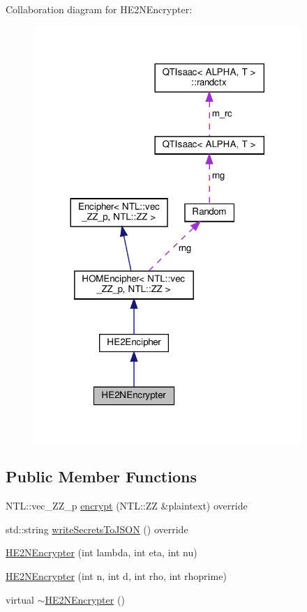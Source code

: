 Collaboration diagram for H\+E2\+N\+Encrypter\+:\nopagebreak
\begin{figure}[H]
\begin{center}
\leavevmode
\includegraphics[width=288pt]{classHE2NEncrypter__coll__graph}
\end{center}
\end{figure}
\subsection*{Public Member Functions}
\begin{DoxyCompactItemize}
\item 
N\+T\+L\+::vec\+\_\+\+Z\+Z\+\_\+p \hyperlink{classHE2NEncrypter_aa7ae559f2407b7a5527bd42470224e1b}{encrypt} (N\+T\+L\+::\+ZZ \&plaintext) override
\item 
std\+::string \hyperlink{classHE2NEncrypter_a720d4ee52dadd55f61631554d2942a6b}{write\+Secrets\+To\+J\+S\+ON} () override
\item 
\hyperlink{classHE2NEncrypter_aa71432cbbe9565717fc5af638649d8d8}{H\+E2\+N\+Encrypter} (int lambda, int eta, int nu)
\item 
\hyperlink{classHE2NEncrypter_a3cb8269ce3f3de2f9a12d350366b36f9}{H\+E2\+N\+Encrypter} (int n, int d, int rho, int rhoprime)
\item 
virtual \hyperlink{classHE2NEncrypter_aa5ed36da105b7f9e4fa5fba012e37b0a}{$\sim$\+H\+E2\+N\+Encrypter} ()
\end{DoxyCompactItemize}
